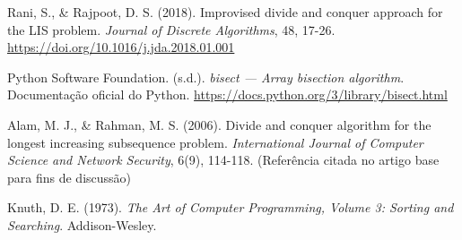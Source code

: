 \documentclass[por]{ajceam-class}
\begin{document}
\begin{thebibliography}{9}

 Rani, S., \& Rajpoot, D. S. (2018). Improvised divide and conquer approach for the LIS problem. \textit{Journal of Discrete Algorithms}, 48, 17-26. \url{https://doi.org/10.1016/j.jda.2018.01.001}

 Python Software Foundation. (s.d.). \textit{bisect — Array bisection algorithm}. Documentação oficial do Python. \url{https://docs.python.org/3/library/bisect.html}

 Alam, M. J., \& Rahman, M. S. (2006). Divide and conquer algorithm for the longest increasing subsequence problem. \textit{International Journal of Computer Science and Network Security}, 6(9), 114-118. (Referência citada no artigo base para fins de discussão)

 Knuth, D. E. (1973). \textit{The Art of Computer Programming, Volume 3: Sorting and Searching}. Addison-Wesley. 


\end{thebibliography}
\end{document}
